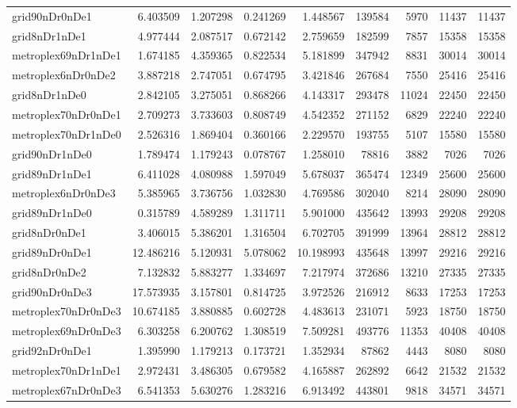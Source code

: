 \begin{longtable}{|l|r|r|r|r|r|r|r|r|}
grid90nDr0nDe1 & 6.403509 & 1.207298 & 0.241269 & 1.448567 & 139584 & 5970 & 11437 & 11437 \\
grid8nDr1nDe1 & 4.977444 & 2.087517 & 0.672142 & 2.759659 & 182599 & 7857 & 15358 & 15358 \\
metroplex69nDr1nDe1 & 1.674185 & 4.359365 & 0.822534 & 5.181899 & 347942 & 8831 & 30014 & 30014 \\
metroplex6nDr0nDe2 & 3.887218 & 2.747051 & 0.674795 & 3.421846 & 267684 & 7550 & 25416 & 25416 \\
grid8nDr1nDe0 & 2.842105 & 3.275051 & 0.868266 & 4.143317 & 293478 & 11024 & 22450 & 22450 \\
metroplex70nDr0nDe1 & 2.709273 & 3.733603 & 0.808749 & 4.542352 & 271152 & 6829 & 22240 & 22240 \\
metroplex70nDr1nDe0 & 2.526316 & 1.869404 & 0.360166 & 2.229570 & 193755 & 5107 & 15580 & 15580 \\
grid90nDr1nDe0 & 1.789474 & 1.179243 & 0.078767 & 1.258010 & 78816 & 3882 & 7026 & 7026 \\
grid89nDr1nDe1 & 6.411028 & 4.080988 & 1.597049 & 5.678037 & 365474 & 12349 & 25600 & 25600 \\
metroplex6nDr0nDe3 & 5.385965 & 3.736756 & 1.032830 & 4.769586 & 302040 & 8214 & 28090 & 28090 \\
grid89nDr1nDe0 & 0.315789 & 4.589289 & 1.311711 & 5.901000 & 435642 & 13993 & 29208 & 29208 \\
grid8nDr0nDe1 & 3.406015 & 5.386201 & 1.316504 & 6.702705 & 391999 & 13964 & 28812 & 28812 \\
grid89nDr0nDe1 & 12.486216 & 5.120931 & 5.078062 & 10.198993 & 435648 & 13997 & 29216 & 29216 \\
grid8nDr0nDe2 & 7.132832 & 5.883277 & 1.334697 & 7.217974 & 372686 & 13210 & 27335 & 27335 \\
grid90nDr0nDe3 & 17.573935 & 3.157801 & 0.814725 & 3.972526 & 216912 & 8633 & 17253 & 17253 \\
metroplex70nDr0nDe3 & 10.674185 & 3.880885 & 0.602728 & 4.483613 & 231071 & 5923 & 18750 & 18750 \\
metroplex69nDr0nDe3 & 6.303258 & 6.200762 & 1.308519 & 7.509281 & 493776 & 11353 & 40408 & 40408 \\
grid92nDr0nDe1 & 1.395990 & 1.179213 & 0.173721 & 1.352934 & 87862 & 4443 & 8080 & 8080 \\
metroplex70nDr1nDe1 & 2.972431 & 3.486305 & 0.679582 & 4.165887 & 262892 & 6642 & 21532 & 21532 \\
metroplex67nDr0nDe3 & 6.541353 & 5.630276 & 1.283216 & 6.913492 & 443801 & 9818 & 34571 & 34571 \\

\end{longtable}
